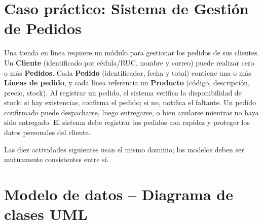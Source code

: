 \documentclass[11pt,a4paper]{article}
\begin{document}
\section*{Caso práctico: Sistema de Gestión de Pedidos}
Una tienda en línea requiere un módulo para gestionar los pedidos de sus clientes. Un
\textbf{Cliente} (identificado por cédula/RUC, nombre y correo) puede realizar cero o más
\textbf{Pedidos}. Cada \textbf{Pedido} (identificador, fecha y total) contiene una o más
\textbf{Líneas de pedido}, y cada línea referencia un \textbf{Producto} (código, descripción,
precio, stock). Al registrar un pedido, el sistema verifica la disponibilidad de stock: si hay
existencias, confirma el pedido; si no, notifica el faltante. Un pedido confirmado puede
despacharse, luego entregarse, o bien anularse mientras no haya sido entregado. El sistema debe
registrar los pedidos con rapidez y proteger los datos personales del cliente.

\bigskip
\noindent Las diez actividades siguientes usan el mismo dominio; los modelos deben ser
mutuamente consistentes entre sí.

\section{Modelo de datos -- Diagrama de clases UML}
\end{document}
